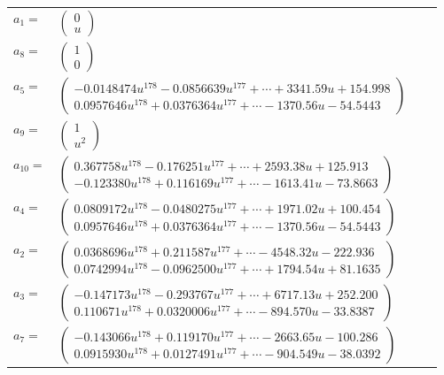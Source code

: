 \documentclass[1p]{elsarticle_modified}
\theoremstyle{definition}
\begin{document}
\begin{tabular}{m{7pt} m{180pt} m{7pt} m{180pt} }
\flushright $a_{1}=$&$\begin{pmatrix}0\\u\end{pmatrix}$ \\
\flushright $a_{8}=$&$\begin{pmatrix}1\\0\end{pmatrix}$ \\
\flushright $a_{5}=$&$\begin{pmatrix}-0.0148474 u^{178}-0.0856639 u^{177}+\cdots+3341.59 u+154.998\\0.0957646 u^{178}+0.0376364 u^{177}+\cdots-1370.56 u-54.5443\end{pmatrix}$ \\
\flushright $a_{9}=$&$\begin{pmatrix}1\\u^2\end{pmatrix}$ \\
\flushright $a_{10}=$&$\begin{pmatrix}0.367758 u^{178}-0.176251 u^{177}+\cdots+2593.38 u+125.913\\-0.123380 u^{178}+0.116169 u^{177}+\cdots-1613.41 u-73.8663\end{pmatrix}$ \\
\flushright $a_{4}=$&$\begin{pmatrix}0.0809172 u^{178}-0.0480275 u^{177}+\cdots+1971.02 u+100.454\\0.0957646 u^{178}+0.0376364 u^{177}+\cdots-1370.56 u-54.5443\end{pmatrix}$ \\
\flushright $a_{2}=$&$\begin{pmatrix}0.0368696 u^{178}+0.211587 u^{177}+\cdots-4548.32 u-222.936\\0.0742994 u^{178}-0.0962500 u^{177}+\cdots+1794.54 u+81.1635\end{pmatrix}$ \\
\flushright $a_{3}=$&$\begin{pmatrix}-0.147173 u^{178}-0.293767 u^{177}+\cdots+6717.13 u+252.200\\0.110671 u^{178}+0.0320006 u^{177}+\cdots-894.570 u-33.8387\end{pmatrix}$ \\
\flushright $a_{7}=$&$\begin{pmatrix}-0.143066 u^{178}+0.119170 u^{177}+\cdots-2663.65 u-100.286\\0.0915930 u^{178}+0.0127491 u^{177}+\cdots-904.549 u-38.0392\end{pmatrix}$ \\

\end{tabular}
\end{document}
